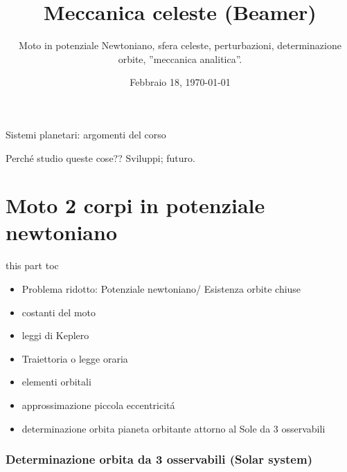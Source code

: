 \documentclass[10pt,xcolor={usenames},fleqn,mathserif,serif]{beamer}
\title{Meccanica celeste (Beamer)}
\subtitle{Moto in potenziale Newtoniano, sfera celeste, perturbazioni, determinazione orbite, ''meccanica analitica''.}
\date{Febbraio 18, \today}
\begin{document}

\begin{frame}
  \titlepage
\end{frame}


\begin{frame}[allowframebreaks]{Sistemi planetari: argomenti del corso}
\tableofcontents[onlyparts]
\end{frame}

\begin{wordonframe}{Perch\'e studio queste cose?? Sviluppi; futuro.}

\end{wordonframe}

\part{Moto 2 corpi in potenziale newtoniano}
\begin{frame}{this part toc}
\begin{itemize}
\item Problema ridotto: Potenziale newtoniano/ Esistenza orbite chiuse
\item costanti del moto
\item leggi di Keplero
\item Traiettoria o legge oraria
\item elementi orbitali
\item approssimazione piccola eccentricit\'a
\item determinazione orbita pianeta orbitante attorno al Sole da 3 osservabili
\end{itemize}
\end{frame}


\section{Determinazione orbita da 3 osservabili (Solar system)}

\end{document}
